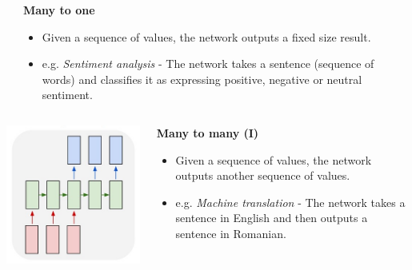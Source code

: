 \documentclass{beamer}
\begin{document}
\begin{frame}[allowframebreaks]
\begin{columns}
\begin{column}{0.3\textwidth}
    \end{column}
    \begin{column}{0.7\textwidth}
      \begin{center}
        \textbf{Many to one}
      \end{center}
      \begin{itemize}
        \item Given a sequence of values, the network outputs a fixed size result.
        \item e.g. \textit{Sentiment analysis} - The network takes a sentence (sequence of words) and classifies it as expressing positive, negative or neutral sentiment.
      \end{itemize}
    \end{column}
  \end{columns}
  \framebreak
  \begin{columns}
    \begin{column}{0.5\textwidth}
      \includegraphics[height=0.7\textheight]{../img/rnn-many-to-many-1.png}
    \end{column}
    \begin{column}{0.5\textwidth}
      \begin{center}
        \textbf{Many to many (I)}
      \end{center}
      \begin{itemize}
        \item Given a sequence of values, the network outputs another sequence of values.
        \item e.g. \textit{Machine translation} - The network takes a sentence in English and then outputs a sentence in Romanian.

\end{itemize}
\end{column}
\end{columns}
\end{frame}
\end{document}

